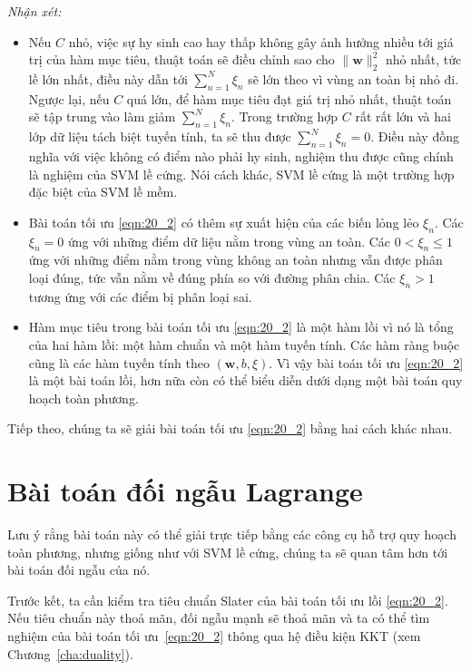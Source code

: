 \textit{Nhận xét:}
\begin{itemize}
\item Nếu $C$ nhỏ, việc {sự hy sinh} cao hay thấp không gây ảnh hưởng
nhiều tới giá trị của hàm mục tiêu, thuật toán sẽ điều chỉnh sao cho
$\|\mathbf{w}\|_2^2$ nhỏ nhất, tức lề lớn nhất, điều này
dẫn tới $\sum_{n=1}^N\xi_n$ sẽ lớn theo vì vùng an toàn bị nhỏ đi. Ngược
lại, nếu $C$ quá lớn, để hàm mục tiêu đạt giá trị nhỏ nhất, thuật toán sẽ
tập trung vào làm giảm $\sum_{n=1}^N\xi_n$. Trong trường hợp $C$ rất rất lớn
và hai lớp dữ liệu tách biệt tuyến tính, ta sẽ thu được $\sum_{n=1}^N\xi_n
= 0$. Điều này đồng nghĩa với
việc không có điểm nào phải {hy sinh}, nghiệm thu được cũng chính là nghiệm của SVM lề cứng. Nói cách khác, SVM lề cứng là
một trường hợp đặc biệt của SVM lề mềm.

\item Bài toán tối ưu \eqref{eqn:20_2} có thêm sự xuất hiện của các
biến lỏng lẻo $\xi_n$. Các $\xi_n = 0$ ứng với những
điểm dữ liệu nằm trong {vùng an toàn}. Các $0 < \xi_n \leq 1$ ứng với những điểm nằm trong {vùng không an toàn} nhưng vẫn được phân
loại
đúng, tức vẫn nằm về đúng phía so với đường phân chia. Các $\xi_n > 1$
tương ứng với các điểm bị phân loại sai.

\item Hàm mục tiêu trong bài toán tối ưu \eqref{eqn:20_2} là một hàm lồi vì nó là tổng của hai hàm lồi: một hàm chuẩn và một hàm tuyến tính. Các hàm ràng buộc cũng là các hàm tuyến tính theo $(\mathbf{w}, b, \xi)$. Vì vậy bài toán tối ưu \eqref{eqn:20_2} là một bài toán lồi, hơn nữa còn có thể biểu diễn dưới dạng một bài toán quy hoạch toàn phương.
\end{itemize}

Tiếp theo, chúng ta sẽ giải bài toán tối ưu \eqref{eqn:20_2} bằng hai
cách khác nhau.

\section{Bài toán đối ngẫu Lagrange }
Lưu ý rằng bài toán này có thể giải trực tiếp bằng các công cụ hỗ trợ quy hoạch toàn phương, nhưng
giống như với SVM lề cứng, chúng ta sẽ quan tâm hơn tới bài toán đối ngẫu của nó.

Trước kết, ta cần kiểm tra tiêu chuẩn Slater của bài toán tối ưu lồi
\eqref{eqn:20_2}. Nếu tiêu chuẩn này thoả mãn, đối ngẫu mạnh sẽ
thoả mãn và ta có thể tìm nghiệm của bài toán tối ưu~\eqref{eqn:20_2} thông qua
hệ điều kiện KKT (xem Chương~\ref{cha:duality}).


